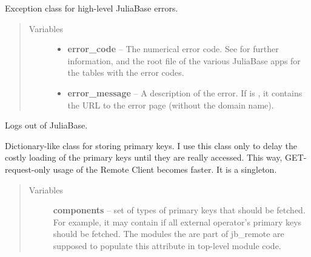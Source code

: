 \documentclass[a4paper,11pt,english]{sphinxmanual}
\begin{document}

\begin{fulllineitems}
\label{programming/remote_client:jb_remote.common.JuliaBaseError}
Exception class for high-level JuliaBase errors.
\begin{quote}\begin{description}
\item[{Variables}] \leavevmode\begin{itemize}
\item {} 
\textbf{error\_code} -- The numerical error code.  See 
for further information, and the root  file of the various
JuliaBase apps for the tables with the error codes.

\item {} 
\textbf{error\_message} -- A description of the error.  If  is , it
contains the URL to the error page (without the domain name).

\end{itemize}

\end{description}\end{quote}

\end{fulllineitems}


\begin{fulllineitems}
\label{programming/remote_client:jb_remote.common.logout}
Logs out of JuliaBase.

\end{fulllineitems}


\begin{fulllineitems}
\label{programming/remote_client:jb_remote.common.PrimaryKeys}
Dictionary-like class for storing primary keys.  I use this class only
to delay the costly loading of the primary keys until they are really
accessed.  This way, GET-request-only usage of the Remote Client becomes
faster.  It is a singleton.
\begin{quote}\begin{description}
\item[{Variables}] \leavevmode
\textbf{components} -- set of types of primary keys that should be fetched.  For
example, it may contain  if all external
operator's primary keys should be fetched.  The modules the are part of
jb\_remote are supposed to populate this attribute in top-level module
code.

\end{description}\end{quote}

\end{fulllineitems}
\end{document}
